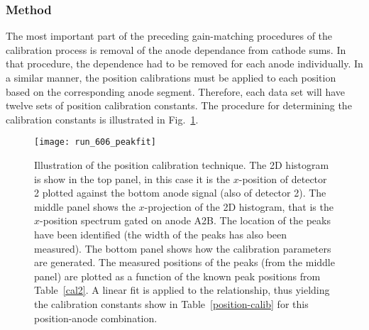 \subsubsection{Method}
The most important part of the preceding gain-matching procedures of the calibration process is removal of the anode dependance from cathode sums. In that procedure, the dependence had to be removed for each anode individually. In a similar manner, the position calibrations must be applied to each position based on the corresponding anode segment. Therefore, each data set will have twelve sets of position calibration constants. The procedure for determining the calibration constants is illustrated in Fig.~\ref{peakfit}.

\begin{figure}[ht!]%
\texttt{[image: run\_606\_peakfit]}%
\caption{Illustration of the position calibration technique. The 2D histogram is show in the top panel, in this case it is the $x$-position of detector 2 plotted against the bottom anode signal (also of detector 2). The middle panel shows the $x$-projection of the 2D histogram, that is the $x$-position spectrum gated on anode A2B. The location of the peaks have been identified (the width of the peaks has also been measured). The bottom panel shows how the calibration parameters are generated. The measured positions of the peaks (from the middle panel) are plotted as a function of the known peak positions from Table~\ref{cal2}. A linear fit is applied to the relationship, thus yielding the calibration constants show in Table~\ref{position-calib} for this position-anode combination.
}%
\label{peakfit}%
\end{figure}

